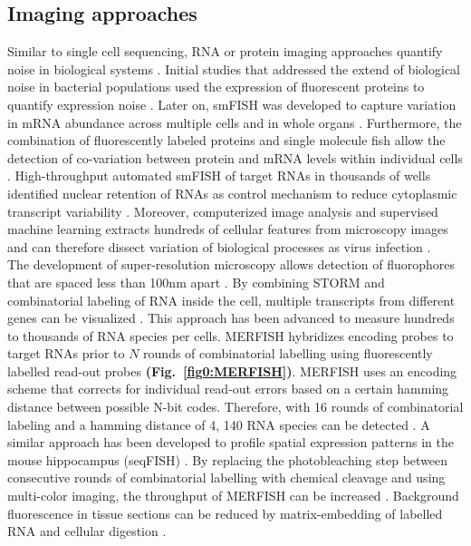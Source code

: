 \subsection{Imaging approaches}

Similar to single cell sequencing, RNA or protein imaging approaches quantify noise in biological systems \citep{Harton2017a}. Initial studies that addressed the extend of biological noise in bacterial populations used the expression of fluorescent proteins to quantify expression noise \citep{Elowitz2002, Blake2003}. Later on, \gls{smFISH} was developed to capture variation in mRNA abundance across multiple cells \citep{Fang2013a, Lyubimova2013, Sanchez2013} and in whole organs \citep{Yang2014b}. Furthermore, the combination of fluorescently labeled proteins and single molecule fish allow the detection of co-variation between protein and mRNA levels within individual cells \citep{Taniguchi2011}. High-throughput automated smFISH of target RNAs in thousands of wells \citep{Battich2013} identified nuclear retention of RNAs as control mechanism to reduce cytoplasmic transcript variability \citep{Battich2015a}. Moreover, computerized image analysis and supervised machine learning extracts hundreds of cellular features from microscopy images and can therefore dissect variation of biological processes as virus infection \citep{Snijder2009}.\\

The development of super-resolution microscopy allows detection of fluorophores that are spaced less than 100nm apart \citep{Sydor2015}. By combining \gls{STORM} and combinatorial labeling of RNA inside the cell, multiple transcripts from different genes can be visualized \citep{Lubeck2012}. This approach has been advanced to measure hundreds to thousands of RNA species per cells. \Gls{MERFISH} hybridizes encoding probes to target RNAs prior to $N$ rounds of combinatorial labelling using fluorescently labelled read-out probes \textbf{(Fig.~\ref{fig0:MERFISH})}. MERFISH uses an encoding scheme that corrects for individual read-out errors based on a certain hamming distance between possible N-bit codes. Therefore, with 16 rounds of combinatorial labeling and a hamming distance of 4, 140 RNA species can be detected \citep{Chen2015}. A similar approach has been developed to profile spatial expression patterns in the mouse hippocampus (seqFISH) \citep{Shah2016}. By replacing the photobleaching step between consecutive rounds of combinatorial labelling with chemical cleavage and using multi-color imaging, the throughput of MERFISH can be increased \citep{Moffitt2016a}. Background fluorescence in tissue sections can be reduced by matrix-embedding of labelled RNA and cellular digestion \citep{Moffitt2016}.

